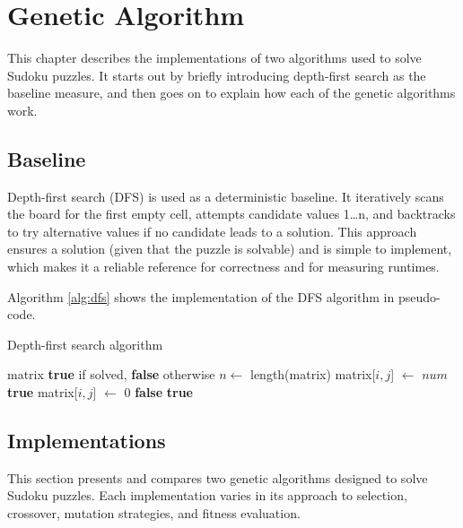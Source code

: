 \section{Genetic Algorithm}\label{sec:algorithm}
This chapter describes the implementations of two algorithms used to solve Sudoku puzzles.
It starts out by briefly introducing depth-first search as the baseline measure, and then goes on to explain how each of the genetic algorithms work.

\subsection{Baseline}
Depth-first search (DFS) is used as a deterministic baseline. It iteratively scans the board for the first empty cell, attempts candidate values 1\dots n, and backtracks to try alternative values if no candidate leads to a solution. This approach ensures a solution (given that the puzzle is solvable) and is simple to implement, which makes it a reliable reference for correctness and for measuring runtimes.

Algorithm \ref{alg:dfs} shows the implementation of the DFS algorithm in pseudo-code.

\begin{algorithm}[H]
\caption{Depth-first search algorithm}\label{alg:dfs}
\begin{adjustbox}{width=1\textwidth,left}
\begin{minipage}{\textwidth}
\begin{algorithmic}
\Require matrix
\Ensure \textbf{true} if solved, \textbf{false} otherwise
\State $n \gets$ length(matrix)
          \State matrix[$i,j$] $\gets$ $num$
           \State \Return \textbf{true} \EndIf
          \State matrix[$i,j$] $\gets$ 0
        \EndIf
      \EndFor
      \State \Return \textbf{false}
    \EndIf
  \EndFor
\EndFor
\State \Return \textbf{true}
\end{algorithmic}
\end{minipage}
\end{adjustbox}
\end{algorithm}

\subsection{Implementations}
This section presents and compares two genetic algorithms designed to solve Sudoku puzzles. Each implementation varies in its approach to selection, crossover, mutation strategies, and fitness evaluation.

